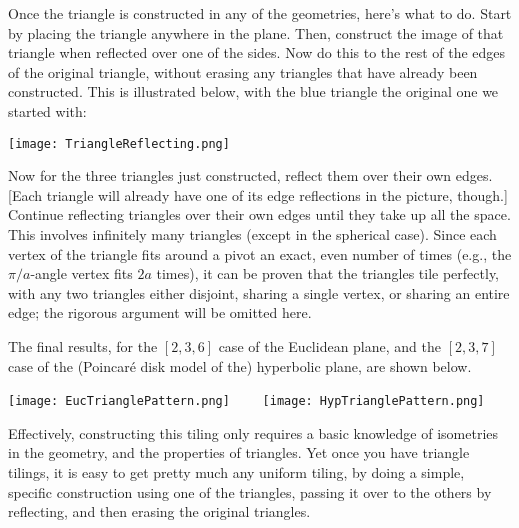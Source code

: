 \documentclass[leqno]{book}
\begin{document}
Once the triangle is constructed in any of the geometries, here's what to do.  Start by placing the triangle anywhere in the plane.  Then, construct the image of that triangle when reflected over one of the sides.  Now do this to the rest of the edges of the original triangle, without erasing any triangles that have already been constructed.  This is illustrated below, with the blue triangle the original one we started with:
\begin{center}\texttt{[image: TriangleReflecting.png]}\end{center}
Now for the three triangles just constructed, reflect them over their own edges.  [Each triangle will already have one of its edge reflections in the picture, though.]  Continue reflecting triangles over their own edges until they take up all the space.  This involves infinitely many triangles (except in the spherical case).  Since each vertex of the triangle fits around a pivot an exact, even number of times (e.g., the $\pi/a$-angle vertex fits $2a$ times), it can be proven that the triangles tile perfectly, with any two triangles either disjoint, sharing a single vertex, or sharing an entire edge; the rigorous argument will be omitted here.

The final results, for the $[2,3,6]$ case of the Euclidean plane, and the $[2,3,7]$ case of the (Poincar\'e disk model of the) hyperbolic plane, are shown below.
\begin{center}
\texttt{[image: EucTrianglePattern.png]}~~~~
\texttt{[image: HypTrianglePattern.png]}
\end{center} %
Effectively, constructing this tiling only requires a basic knowledge of isometries in the geometry, and the properties of triangles.  Yet once you have triangle tilings, it is easy to get pretty much any uniform tiling, by doing a simple, specific construction using one of the triangles, passing it over to the others by reflecting, and then erasing the original triangles.
\end{document}
